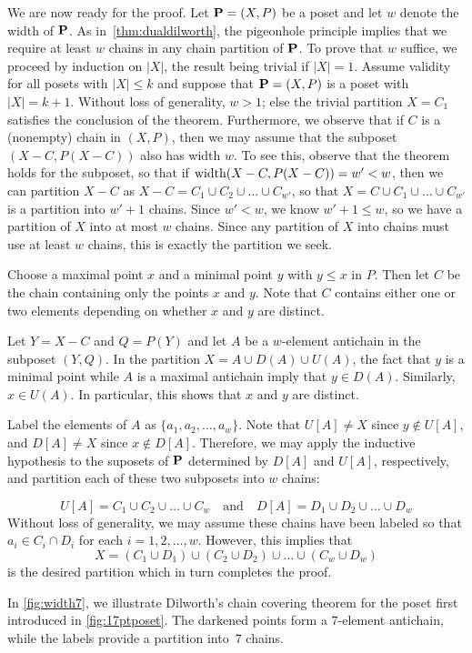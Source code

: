 We are now ready for the proof.  Let $\mathbf{P}=(X,P)$ be a poset and let $w$ denote
the width of $\mathbf{P}$.
As in~\autoref{thm:dualdilworth}, the pigeonhole principle implies
that we require at least $w$ chains in any chain partition of
$\mathbf{P}$. To prove that $w$ suffice, we
proceed by induction on $|X|$, the result being trivial if
$|X|=1$. Assume validity for all posets with $|X|\le k$ and suppose
that $\mathbf{P}=(X,P)$ is a poset with $|X|=k+1$. Without loss of generality,
$w>1$; else the trivial partition $X=C_1$ satisfies the
conclusion of the theorem. Furthermore, we observe that if $C$ is a
(nonempty) chain in $(X,P)$, then we may assume that the subposet
$(X-C,P(X-C))$ also has width $w$. To see this, observe that the
theorem holds for the subposet, so that if
$\operatorname{width}(X-C,P(X-C))=w'<w$, then we can partition $X-C$ as
$X-C=C_1\cup C_2\cup\dots\cup C_{w'}$, so that $X=C\cup
C_1\cup\dots\cup C_{w'}$ is a partition into $w'+1$ chains. Since
$w'<w$, we know $w'+1\le w$, so we have a partition of $X$ into at
most $w$ chains. Since any partition of $X$ into chains must use at
least $w$ chains, this is exactly the partition we seek.

Choose a maximal point $x$ and a minimal point $y$ with $y\le x$ in
$P$. Then let $C$ be the chain containing only the points $x$ and $y$. Note that
$C$ contains either one or two elements depending on whether $x$
and $y$ are distinct.

Let $Y=X-C$ and  $Q=P(Y)$ and let $A$ be a $w$-element antichain
in the  subposet $(Y,Q)$.  In the partition $X=A\cup D(A)\cup U(A)$, the
fact that $y$ is a minimal point while $A$ is a maximal
antichain imply that $y\in D(A)$.  Similarly, $x\in U(A)$.  In particular,
this shows that $x$ and $y$ are distinct.

Label the elements of $A$ as
$\{a_1,a_2,\dots,a_w\}$. Note
that $U[A]\ne X$ since $y\notin U[A]$, and $D[A]\ne X$ since
$x\notin D[A]$. Therefore, we may apply the inductive hypothesis to
the suposets of $\mathbf{P}$ determined by $D[A]$ and $U[A]$, respectively,
and partition each of these two subposets into $w$ chains: 

\[
U[A]= C_1\cup C_2\cup\dots\cup C_w\quad\text{and}\quad
 D[A]=D_1\cup D_2\cup\dots\cup D_w
\]
Without loss of generality, we may assume these chains have
been labeled so that $a_i\in C_i\cap D_i$ for each $i=1,2,\dots,w$. 
However, this implies that 
\[
X=(C_1\cup D_1)\cup (C_2\cup D_2)\cup\dots\cup(C_w\cup D_w)
\]
is the desired partition which in turn completes the proof.

In \autoref{fig:width7}, we illustrate Dilworth's chain covering
theorem for the poset first introduced in \autoref{fig:17ptposet}.
The darkened points form a $7$-element antichain, while the labels
provide a partition into~$7$ chains.

